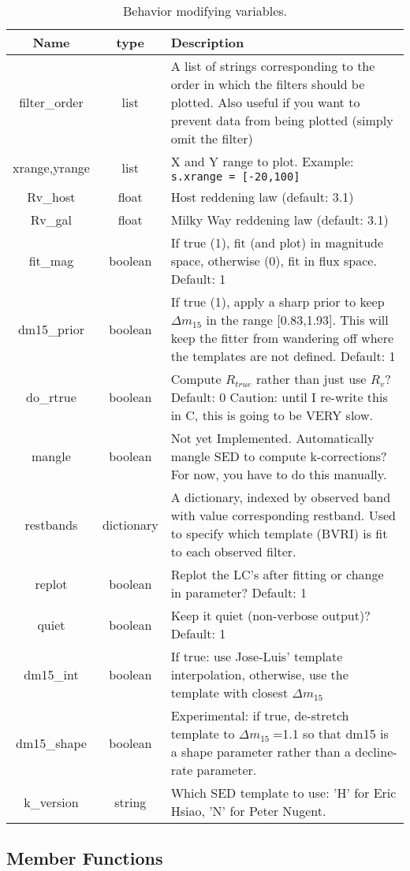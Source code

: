 \documentclass[12pt]{article}
\providecommand{\tabularnewline}{\\}
\newcommand{\dmf}{$\Delta m_{15}\ $}
\begin{document}
%
\begin{table}
\begin{tabular}{|c|c|>{\raggedright}p{}|}
\hline 
Name&
type&
Description\tabularnewline
\hline
\hline 
filter\_order&
list&
A list of strings corresponding to the order in which the filters
should be plotted. Also useful if you want to prevent data from being
plotted (simply omit the filter)\tabularnewline
\hline 
xrange,yrange&
list&
X and Y range to plot. Example: \texttt{s.xrange = {[}-20,100]}\tabularnewline
\hline 
Rv\_host&
float&
Host reddening law (default: 3.1)\tabularnewline
\hline 
Rv\_gal&
float&
Milky Way reddening law (default: 3.1)\tabularnewline
\hline 
fit\_mag&
boolean&
If true (1), fit (and plot) in magnitude space, otherwise (0), fit
in flux space. Default: 1\tabularnewline
\hline 
dm15\_prior&
boolean&
If true (1), apply a sharp prior to keep $\Delta m_{15}$ in the range
{[}0.83,1.93]. This will keep the fitter from wandering off where
the templates are not defined. Default: 1\tabularnewline
\hline 
do\_rtrue&
boolean&
Compute $R_{true}$ rather than just use $R_{v}$? Default: 0 Caution:
until I re-write this in C, this is going to be VERY slow.\tabularnewline
\hline 
mangle&
boolean&
Not yet Implemented. Automatically mangle SED to compute k-corrections?
For now, you have to do this manually.\tabularnewline
\hline 
restbands&
dictionary&
A dictionary, indexed by observed band with value corresponding restband.
Used to specify which template (BVRI) is fit to each observed filter.\tabularnewline
\hline 
replot&
boolean&
Replot the LC's after fitting or change in parameter? Default: 1\tabularnewline
\hline 
quiet&
boolean&
Keep it quiet (non-verbose output)? Default: 1\tabularnewline
\hline 
dm15\_int&
boolean&
If true: use Jose-Luis' template interpolation, otherwise, use the
template with closest \dmf\tabularnewline
\hline 
dm15\_shape&
boolean&
Experimental: if true, de-stretch template to \dmf=1.1 so that dm15
is a shape parameter rather than a decline-rate parameter.\tabularnewline
\hline 
k\_version&
string&
Which SED template to use: 'H' for Eric Hsiao, 'N' for Peter Nugent.\tabularnewline
\hline
\end{tabular}


\caption{Behavior modifying variables.\label{tab:behave_var}}
\end{table}



\subsection{Member Functions}
\end{document}
